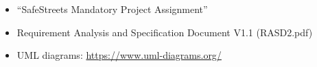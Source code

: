 \clearpage
{}
\label{sect:effort}



\clearpage
{}


\begin{itemize}
        \item
        “SafeStreets Mandatory Project Assignment”
        \item
        Requirement Analysis and Specification Document V1.1 (RASD2.pdf)
        \item
        UML diagrams: \url{https://www.uml-diagrams.org/}
\end{itemize}





